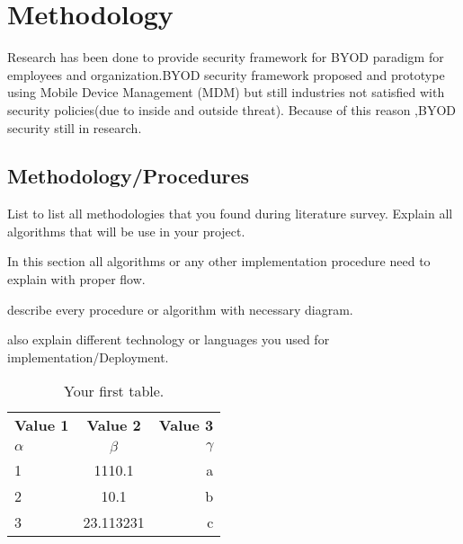 \graphicspath{ {images/} }
\chapter{Methodology}
\hspace{5mm} Research has been done to provide security framework for BYOD paradigm for employees and organization.BYOD security framework proposed and prototype using Mobile Device Management (MDM) but still industries not satisfied with security policies(due  to inside and outside threat).
Because of this reason ,BYOD security still in research.

\section{Methodology/Procedures} 
List to list all methodologies that you found during literature survey. Explain all algorithms that will be use in your project.

\hspace{5mm}In this section all algorithms or any other implementation procedure need to explain with proper flow.
\par describe every procedure or algorithm with necessary diagram.
\par also explain different technology or languages you used for implementation/Deployment.

\begin{table}[h!]
  \begin{center}
    \caption{Your first table.}
    \label{tab:table1}
    \begin{tabular}{l|c|r} %
      \textbf{Value 1} & \textbf{Value 2} & \textbf{Value 3}\\
      $\alpha$ & $\beta$ & $\gamma$ \\
      \hline
      1 & 1110.1 & a\\
      \hline
      2 & 10.1 & b\\
      3 & 23.113231 & c\\
    \end{tabular}
  \end{center}
\end{table}

